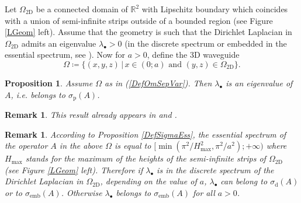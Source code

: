 \documentclass[11pt,a4paper]{article}
\newcommand{\Om}{\Omega}
\newcommand{\mrm}[1]{\mathrm{#1}}
\newcommand{\R}{\mathbb{R}}
\newtheorem{remark}[theorem]{Remark}
\newtheorem{proposition}[theorem]{Proposition}
\begin{document}
\noindent Let $\Om_{\mrm{2D}}$ be a connected domain of $\R^2$ with Lipschitz boundary which coincides with a union of semi-infinite strips outside of a bounded region (see Figure \ref{LGeom} left). Assume that the geometry is such that the Dirichlet Laplacian in $\Om_{\mrm{2D}}$ admits an eigenvalue $\lambda_\bullet>0$ (in the discrete spectrum or  embedded in the essential spectrum, see \cite{Wits90}). Now for $a>0$, define the 3D waveguide
\begin{equation}\label{DefOmSepVar}
\Om\coloneqq\{(x,y,z)\,|\,x\in(0;a)\mbox{ and }(y,z)\in\Om_{\mrm{2D}}\}. 
\end{equation}
\begin{proposition}\label{PropoSeparationVaria}
Assume $\Om$ as in (\ref{DefOmSepVar}). Then $\lambda_\bullet$ is an eigenvalue of $A$, \textit{i.e.} belongs to $\sigma_{\mrm{p}}(A)$.
\end{proposition}
\begin{remark}
This result already appears in \cite{ExSe90} and \cite[\S IV.A]{GoJa92}.
\end{remark}
\begin{remark}
According to Proposition \ref{DefSigmaEss}, the essential spectrum of the operator $A$ in the above $\Om$ is equal to $[\min(\pi^2/H^2_\mrm{max},\pi^2/a^2);+\infty)$ where $H_\mrm{max}$ stands for the maximum of the heights of the semi-infinite strips of $\Om_{\mrm{2D}}$ (see Figure \ref{LGeom} left). Therefore if $\lambda_\bullet$ is in the discrete spectrum of the Dirichlet Laplacian in $\Om_{\mrm{2D}}$, depending on the value of $a$, $\lambda_\bullet$ can belong to $\sigma_{\mrm{d}}(A)$ or to $\sigma_{\mrm{emb}}(A)$. Otherwise $\lambda_\bullet$ belongs to $\sigma_{\mrm{emb}}(A)$ for all $a>0$.
\end{remark}
\end{document}
